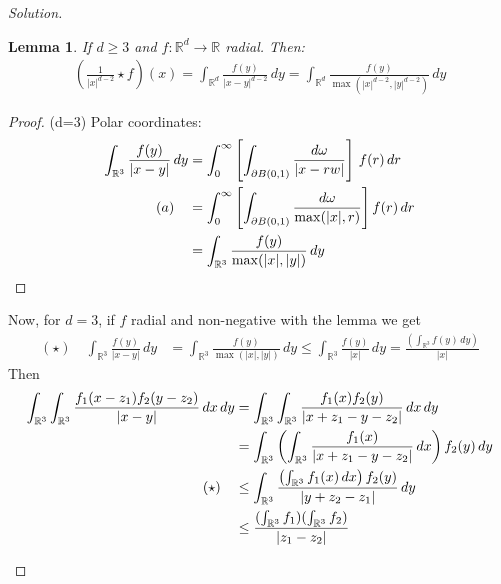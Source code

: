 \documentclass{report}
\theoremstyle{tommy}
\newtheorem{lem}[defn]{Lemma}
\begin{document}
\begin{proof}[Solution]
\begin{enumerate}[label=\alph*)]
    \begin{lem}
      If \(d \ge 3\) and \(f: \mathbb{R}^d \to \mathbb{R}\) radial. Then:
      \begin{align*}
        \left(\frac{1}{|x|^{d-2}} \star f \right)(x) 
        = \int_{\mathbb{R}^d} \frac{f(y)}{|x-y|^{d-2}} \, dy
        = \int_{\mathbb{R}^d} \frac{f(y)}{\max(|x|^{d-2}, |y|^{d-2})}\, dy
      \end{align*}
    \end{lem}
    \begin{proof}
      (d=3) Polar coordinates:
      \begin{align*}
        \int_{\mathbb{R}^3} \frac{f(y)}{|x-y|}\, dy 
        &= \int_0^{\infty} \left[\int_{\partial B(0,1)} \frac{d\omega}{|x-rw|}  \right] \, f(r) \, dr \\
        (a) \quad &= \int_0^\infty \left[\int_{\partial B(0,1)} \frac{d \omega}{\max(|x|, r)}\right] f(r) \, dr \\
        &= \int_{\mathbb{R}^3} \frac{f(y)}{\max(|x|, |y|)} \, dy \qedhere
      \end{align*}
    \end{proof}
      Now, for \(d=3\), if \(f\) radial and non-negative with the lemma we get
      \begin{align*}
        (\star) \quad \int_{\mathbb{R}^3} \frac{f(y)}{|x-y|} \, dy &= \int_{\mathbb{R}^3} \frac{f(y)}{\max(|x|, |y|)} \, dy \le \int_{\mathbb{R}^3} \frac{f(y)}{|x|} \, dy = \frac{(\int_{\mathbb{R}^3}f(y) \, dy)}{|x|}
      \end{align*}
      Then
      \begin{align*}
        \int_{\mathbb{R}^3}\int_{\mathbb{R}^3} \frac{f_1(x-z_1)f_2(y-z_2)}{|x-y|} \, dx \, dy &= \int_{\mathbb{R}^3}\int_{\mathbb{R}^3} \frac{f_1(x) f_2(y)}{|x+ z_1 - y - z_2|} \, dx \, dy \\
        &= \int_{\mathbb{R}^3} \left(\int_{\mathbb{R}^3} \frac{f_1(x) }{|x+ z_1 - y - z_2|} \, dx \right) f_2(y) \, dy \\
        (\star) \quad &\le \int_{\mathbb{R}^3} \frac{\left(\int_{\mathbb{R}^3} f_1(x) \, dx\right)f_2(y)}{|y + z_2 - z_1|}  \, dy \\
        &\le \frac{(\int_{\mathbb{R}^3} f_1)(\int_{\mathbb{R}^3} f_2)}{|z_1 - z_2|} \qedhere
      \end{align*}
    \end{enumerate}
  \end{proof}
  
\end{document}
